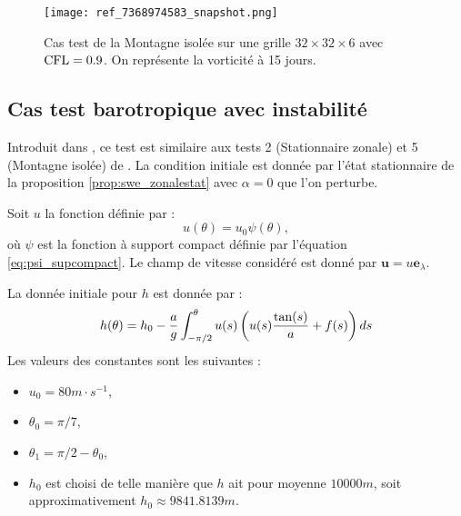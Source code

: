 \begin{figure}[htbp]
\begin{center}
\texttt{[image: ref\_7368974583\_snapshot.png]}
\end{center}
\caption{Cas test de la Montagne isolée \cite{Williamson1992} sur une grille $32 \times 32 \times 6$ avec $\text{CFL}=0.9$. On représente la vorticité à 15 jours.}
\label{fig: williamson 5 vorticité}
\end{figure}





















\subsection{Cas test barotropique avec instabilité}

Introduit dans \cite{Galewsky2004}, ce test est similaire aux tests 2 (Stationnaire zonale) et 5 (Montagne isolée) de \cite{Williamson1992}. La condition initiale est donnée par l'état stationnaire de la proposition \ref{prop:swe_zonalestat} avec $\alpha=0$ que l'on perturbe.

Soit $u$ la fonction définie par :
\begin{equation}
u(\theta) = u_{0} \psi(\theta),
\end{equation}
où $\psi$ est la fonction à support compact définie par l'équation \eqref{eq:psi_supcompact}. Le champ de vitesse considéré est donné par $\mathbf{u} = u \mathbf{e}_{\lambda}$.

La donnée initiale pour $h$ est donnée par :
\begin{equation}
h(\theta) = h_0 - \dfrac{a}{g} \displaystyle\int^{\theta}_{-\pi/2} u(s) \left( u(s) \dfrac{\tan (s)}{a} + f(s) \right) ds
\end{equation}
Les valeurs des constantes sont les suivantes :
\begin{itemize}
\item $u_{0}=80 \si{m} \cdot  \si{s^{-1}}$,
\item $\theta_0 = \pi/7$,
\item $\theta_1 = \pi/2 - \theta_0$,
\item $h_0$ est choisi de telle manière que $h$ ait pour moyenne $10000 \si{m}$, soit approximativement $h_0 \approx 9841.8139 \si{m}$.
\end{itemize}

